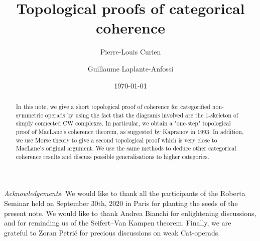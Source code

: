 \documentclass[11pt]{amsart}
\title{Topological proofs of categorical coherence}
\author{Pierre-Louis Curien}
\author{Guillaume Laplante-Anfossi}
\date{\today}
\begin{document}
\begin{abstract}
In this note, we give a short topological proof of coherence for categorified non-symmetric operads by using the fact that the diagrams involved are the 1-skeleton of simply connected CW complexes. 
In particular, we obtain a "one-step" topological proof of MacLane's coherence theorem, as suggested by Kapranov in 1993. 
In addition, we use Morse theory to give a second topological proof which is very close to MacLane's original argument. 
We use the same methods to deduce other categorical coherence results and discuss possible generalisations to higher categories. 
\end{abstract}

\maketitle

\setcounter{tocdepth}{1}





%
%
%
\bigskip

\emph{Acknowledgements.}   
We would like to thank all the participants of the Roberta Seminar held on September 30th, 2020 in Paris for planting the seeds of the present note.  
We would like to thank Andrea Bianchi for enlightening discussions, and for reminding us of the Seifert--Van Kampen theorem. 
Finally, we are grateful to Zoran Petri{\'c} for precious discussions on weak Cat-operads.




\end{document}
